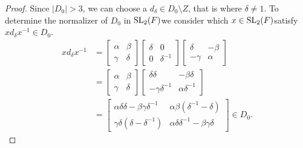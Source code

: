 \begin{proof}
    \leanok
    Since $|D_0| > 3$, we can choose a $d_\delta \in D_0 \! \setminus \! Z$, that is where $\delta \neq 1$. To determine the normalizer of $D_0$ in $\operatorname{SL}_2(F)$we consider which $x \in \operatorname{SL}_2(F)$satisfy $x d_\delta x^{-1} \in D_0$.
    \begin{align}\label{6.3proof3} xd_\delta x^{-1} &= \begin{bmatrix} \alpha & \beta \\ \gamma & \delta \end{bmatrix} \begin{bmatrix} \delta & 0 \\ 0 & \delta^{-1} \end{bmatrix} \begin{bmatrix} \delta & - \beta \\ - \gamma & \alpha \end{bmatrix} \nonumber \\[1.5ex]
    &= \begin{bmatrix} \alpha & \beta \\ \gamma & \delta \end{bmatrix} \begin{bmatrix} \delta \delta & - \beta \delta \\ - \gamma \delta^{-1} & \alpha \delta^{-1} \end{bmatrix} \nonumber \\[1.5ex]
    &= \begin{bmatrix} \alpha \delta \delta - \beta \gamma \delta^{-1} & \alpha \beta (\delta^{-1} - \delta) \\ \gamma \delta (\delta - \delta^{-1}) & \alpha \delta \delta^{-1} - \beta \gamma \delta \end{bmatrix} \in D_0.
    \end{align}
    

\end{proof}

